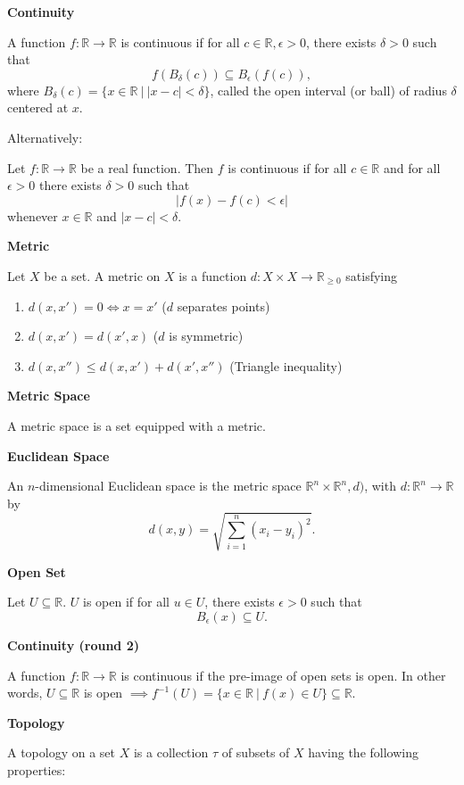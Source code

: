 \documentclass{article}
\newcommand{\inv}{^{-1}}
\newcommand{\R}{\mathbb R}
\begin{document}
\pagecolor{black}
\color{white}

\noindent\textbf{Continuity}

    A function $f: \R \to \R$ is continuous if for all $c \in \R, \epsilon > 0$, there exists $\delta>0$ such that $$f(B_\delta(c)) \subseteq B_\epsilon(f(c)),$$
    where $B_\delta(c)=\{x \in \R~|~|x-c|<\delta\}$, called the open interval (or ball) of radius $\delta$ centered at $x$.

    Alternatively:

    Let $f: \R \to \R$ be a real function. Then $f$ is continuous if for all $c \in \R$ and for all $\epsilon > 0$ there exists $\delta>0$ such that $$|f(x)-f(c)<\epsilon|$$ whenever $x \in \R$ and $|x-c|<\delta$.

\medskip\noindent\textbf{Metric}

	Let $X$ be a set. A metric on $X$ is a function $d: X \times X \to \R_{\geq 0}$ satisfying
	\begin{enumerate}
		\item $d(x,x')=0 \iff x=x'$ ($d$ separates points)
		\item $d(x,x') = d(x',x)$ ($d$ is symmetric)
		\item $d(x,x'') \leq d(x,x') + d(x', x'')$ (Triangle inequality)
	\end{enumerate}

\medskip\noindent\textbf{Metric Space}
	
	A metric space is a set equipped with a metric.

\medskip\noindent\textbf{Euclidean Space}

	An $n$-dimensional Euclidean space is the metric space $\R^n \times \R^n, d)$, with $d: \R^n \to \R$ by $$d(x, y) = \sqrt{\sum_{i=1}^n (x_i-y_i)^2}.$$

\medskip\noindent\textbf{Open Set}

	Let $U \subseteq \R$. $U$ is open if for all $u \in U$, there exists $\epsilon > 0$ such that $$B_\epsilon(x) \subseteq U.$$

\medskip\noindent\textbf{Continuity (round 2)}

	A function $f: \R \to \R$ is continuous if the pre-image of open sets is open. In other words, $U \subseteq \R$ is open $\implies f\inv(U) = \{x \in \R~|~f(x) \in U\} \subseteq \R$.

\medskip\noindent\textbf{Topology}

	A topology on a set $X$ is a collection $\tau$ of subsets of $X$ having the following properties:
\end{document}
